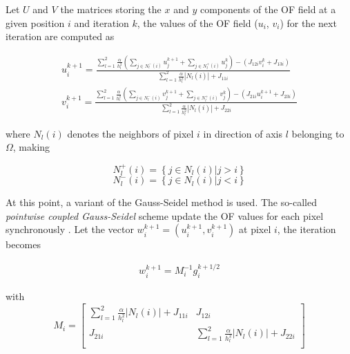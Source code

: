 \documentclass{article}
\begin{document}
Let $U$ and $V$ the matrices storing the $x$ and $y$ components of the OF field 
at a given position $i$ and iteration $k$, the values of the OF field ($u_i$, 
$v_i$) for the next iteration are computed as

\begin{align}
 u_i^{k+1} = \frac{\displaystyle \sum_{l=1}^{2}
                     \frac{\alpha}{h_l^2} \left( \sum_{j \in N_l^-(i)} u_j^{k+1}
                                         + \sum_{j \in N_l^+(i)} u_j^{k} \right)
                                              - (J_{12i} v_{i}^k + J_{13i})}
                  {\displaystyle \sum_{l=1}^{2} \frac{\alpha}{h_l^2} |N_l(i)| + J_{11i}} \\
 v_i^{k+1} = \frac{\displaystyle \sum_{l=1}^{2}
                     \frac{\alpha}{h_l^2} \left( \sum_{j \in N_l^-(i)} v_j^{k+1}
                                         + \sum_{j \in N_l^+(i)} v_j^{k} \right)
                                               - (J_{21i} u_{i}^{k+1} + J_{23i})}
                  {\displaystyle \sum_{l=1}^{2} \frac{\alpha}{h_l^2} |N_l(i)| + J_{22i}}
\end{align}

where $N_l(i)$ denotes the neighbors of pixel $i$ in direction of axis $l$ 
belonging to $\Omega$, making

\[ N_l^+(i) = \left\{ j \in N_l(i) | j > i \right\} \]
\[ N_l^-(i) = \left\{ j \in N_l(i) | j < i \right\} \]

At this point, a variant of the Gauss-Seidel method is used. The so-called 
\textit{pointwise coupled Gauss-Seidel} scheme update the OF values for each 
pixel synchronously \cite{Bruhn05rt,Hac93}. Let the vector 
$w_i^{k+1} = (u_i^{k+1}, v_i^{k+1})$ at pixel $i$, the iteration becomes 

\begin{align}
 w_i^{k+1} = M_i^{-1} g_i^{k+1/2}
\label{eqn:pcGaussSeidel}
\end{align}

with
\[ M_i =
 \left[ \begin{matrix}
  \displaystyle \sum_{l=1}^2 \frac{\alpha}{h_l^2} \left| N_l(i) \right| + J_{11i} &  J_{12i} \\
  J_{21i}  & \displaystyle \sum_{l=1}^2 \frac{\alpha}{h_l^2} \left| N_l(i) \right| + J_{22i} \\
 \end{matrix}
 \right] \]
\end{document}
